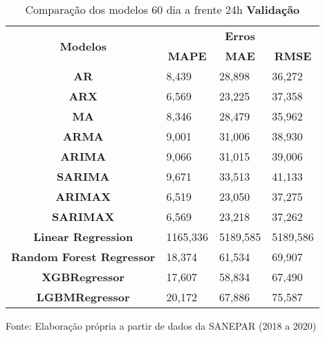 \begin{table}[H]
	\centering
	\caption{Comparação dos modelos 60 dia a frente 24h \textbf{Validação} }\label{tb:60-24vld}
	\begin{tabular}{@{}clll@{}}
		\toprule
		\multirow{2}{*}{\textbf{Modelos}} & \multicolumn{3}{c}{\textbf{Erros}}                                                                       \\ \cmidrule(l){2-4} 
		& \multicolumn{1}{c}{\textbf{MAPE}} & \multicolumn{1}{c}{\textbf{MAE}} & \multicolumn{1}{c}{\textbf{RMSE}} \\ \hline
\textbf{AR}                       & 8,439                             & 28,898                           & 36,272                            \\
\textbf{ARX}                      & 6,569                             & 23,225                           & 37,358                            \\
\textbf{MA}                       & 8,346                             & 28,479                           & 35,962                            \\
\textbf{ARMA}                     & 9,001                             & 31,006                           & 38,930                            \\
\textbf{ARIMA}                    & 9,066                             & 31,015                           & 39,006                            \\
\textbf{SARIMA}                   & 9,671                             & 33,513                           & 41,133                            \\
\textbf{ARIMAX}                   & 6,519                             & 23,050                           & 37,275                            \\
\textbf{SARIMAX}                  & 6,569                             & 23,218                           & 37,262                            \\
\textbf{Linear Regression}        & 1165,336                          & 5189,585                         & 5189,586                          \\
\textbf{Random Forest Regressor}  & 18,374                            & 61,534                           & 69,907                            \\
\textbf{XGBRegressor}             & 17,607                            & 58,834                           & 67,490                            \\
\textbf{LGBMRegressor}            & 20,172                            & 67,886                           & 75,587                            \\ \bottomrule
	\end{tabular}

Fonte: Elaboração própria a partir de dados da SANEPAR (2018 a 2020)
\end{table}

